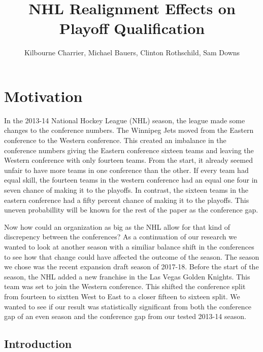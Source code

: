 \documentclass[
]{article}
\title{NHL Realignment Effects on Playoff Qualification}
\author{Kilbourne Charrier, Michael Bauers, Clinton Rothschild, Sam
Downs}
\date{}
\begin{document}
\maketitle

\hypertarget{motivation}{%
\section{Motivation}\label{motivation}}

In the 2013-14 National Hockey League (NHL) season, the league made some
changes to the conference numbers. The Winnipeg Jets moved from the
Eastern conference to the Western conference. This created an imbalance
in the conference numbers giving the Eastern conference sixteen teams
and leaving the Western conference with only fourteen teams. From the
start, it already seemed unfair to have more teams in one conference
than the other. If every team had equal skill, the fourteen teams in the
western conference had an equal one four in seven chance of making it to
the playoffs. In contrast, the sixteen teams in the eastern conference
had a fifty percent chance of making it to the playoffs. This uneven
probabillity will be known for the rest of the paper as the conference
gap.

Now how could an organization as big as the NHL allow for that kind of
discrepency between the conferences? As a continuation of our research
we wanted to look at another season with a similiar balance shift in the
conferences to see how that change could have affected the outcome of
the season. The season we chose was the recent expansion draft season of
2017-18. Before the start of the season, the NHL added a new franchise
in the Las Vegas Golden Knights. This team was set to join the Western
conference. This shifted the conference split from fourteen to sixtten
West to East to a closer fifteen to sixteen split. We wanted to see if
our result was statistically significant from both the conference gap of
an even season and the conference gap from our tested 2013-14 season.

\hypertarget{introduction}{%
\subsection{Introduction}\label{introduction}}
\end{document}
